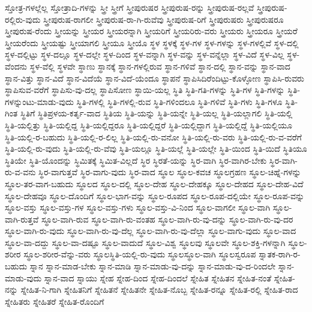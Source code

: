 {ಸ್ತೋತ್ರ-ಗಳಲ್ಲೆಲ್ಲ
ಸ್ತೋತ್ರಾದಿ-ಗಳನ್ನು
ಸ್ತ್ರೀ
ಸ್ತ್ರೀಗೆ
ಸ್ತ್ರೀಪುರುಷರ
ಸ್ತ್ರೀಪುರುಷ-ರನ್ನು
ಸ್ತ್ರೀಪುರುಷ-ರಲ್ಲವೆ
ಸ್ತ್ರೀಪುರುಷ-ರಲ್ಲಿರು-ವುದು
ಸ್ತ್ರೀಪುರುಷ-ರಾಗಲೀ
ಸ್ತ್ರೀಪುರುಷ-ರಾ-ಗಿ-ರುವೆವು
ಸ್ತ್ರೀಪುರುಷ-ರಿಗೆ
ಸ್ತ್ರೀಪುರುಷರು
ಸ್ತ್ರೀಪುರುಷರೂ
ಸ್ತ್ರೀಪುರುಷ-ರೆಂದು
ಸ್ತ್ರೀಯನ್ನು
ಸ್ತ್ರೀಯರ
ಸ್ತ್ರೀಯರನ್ನಾಗಿ
ಸ್ತ್ರೀಯರಿಗೆ
ಸ್ತ್ರೀಯರಿರು-ವರು
ಸ್ತ್ರೀಯರು
ಸ್ತ್ರೀಯರೂ
ಸ್ತ್ರೀಯರೆ
ಸ್ತ್ರೀಯರೆಂದು
ಸ್ತ್ರೀಯಷ್ಟು
ಸ್ತ್ರೀಯಾಗಲಿ
ಸ್ತ್ರೀಯೂ
ಸ್ತ್ರೀಯೊ
ಸ್ಥಳ
ಸ್ಥಳಕ್ಕೆ
ಸ್ಥಳ-ಗಳ
ಸ್ಥಳ-ಗಳನ್ನು
ಸ್ಥಳ-ಗಳಲ್ಲಿವೆ
ಸ್ಥಳ-ದಲ್ಲಿ
ಸ್ಥಳ-ದಲ್ಲಿಟ್ಟು
ಸ್ಥಳ-ದಲ್ಲೂ
ಸ್ಥಳ-ದಲ್ಲೇ
ಸ್ಥಳ-ದಿಂದ
ಸ್ಥಳ-ವನ್ನಾಗಿ
ಸ್ಥಳ-ವನ್ನು
ಸ್ಥಳ-ವನ್ನೆಲ್ಲಾ
ಸ್ಥಳ-ವಿದೆ
ಸ್ಥಳ-ವಿಲ್ಲ
ಸ್ಥಳ-ವೆಂದನು
ಸ್ಥಳ-ವೆಲ್ಲಿ
ಸ್ಥಳವೇ
ಸ್ಥಾಣು
ಸ್ಥಾನಕ್ಕೆ
ಸ್ಥಾನ-ಗಳಲ್ಲಿರುವ
ಸ್ಥಾನ-ಗಳಿವೆ
ಸ್ಥಾನ-ದಲ್ಲಿ
ಸ್ಥಾನ-ವನ್ನು
ಸ್ಥಾನ-ವಾದ
ಸ್ಥಾನ-ವಿತ್ತು
ಸ್ಥಾನ-ವಿದೆ
ಸ್ಥಾನ-ವಿದೆಯೆ
ಸ್ಥಾನ-ವಿದೆ-ಯೆಂದೂ
ಸ್ಥಾಪನೆ
ಸ್ಥಾಪಿಸಿದಿರೆಂದಿಟ್ಟು-ಕೊಳ್ಳೋಣ
ಸ್ಥಾಪಿಸಿ-ರುವರು
ಸ್ಥಾಪಿಸುವ-ವರೆಗೆ
ಸ್ಥಾಪಿಸು-ವು-ದಲ್ಲ
ಸ್ಥಾಪಿಸೋಣ
ಸ್ಥಾಯಿ-ಯಲ್ಲ
ಸ್ಥಿತಿ
ಸ್ಥಿತಿ-ಗತಿ-ಗಳನ್ನು
ಸ್ಥಿತಿ-ಗಳ
ಸ್ಥಿತಿ-ಗಳನ್ನು
ಸ್ಥಿತಿ-ಗಳನ್ನುಂಟು-ಮಾಡು-ವುದು
ಸ್ಥಿತಿ-ಗಳಲ್ಲಿ
ಸ್ಥಿತಿ-ಗಳಲ್ಲಿ-ರುವ
ಸ್ಥಿತಿ-ಗಳಿಂದಲೂ
ಸ್ಥಿತಿ-ಗಳಿವೆ
ಸ್ಥಿತಿ-ಗಳು
ಸ್ಥಿತಿ-ಗಳೂ
ಸ್ಥಿತಿ-ಗಿಂತ
ಸ್ಥಿತಿಗೆ
ಸ್ಥಿತಿಪ್ರಳಯ-ಕರ್ತೃ-ವಾದ
ಸ್ಥಿತಿಯ
ಸ್ಥಿತಿ-ಯನ್ನು
ಸ್ಥಿತಿ-ಯನ್ನೇ
ಸ್ಥಿತಿ-ಯಲ್ಲ
ಸ್ಥಿತಿ-ಯಲ್ಲಾಗಲಿ
ಸ್ಥಿತಿ-ಯಲ್ಲಿ
ಸ್ಥಿತಿ-ಯಲ್ಲಿತ್ತು
ಸ್ಥಿತಿ-ಯಲ್ಲಿದ್ದ
ಸ್ಥಿತಿ-ಯಲ್ಲಿದ್ದರೂ
ಸ್ಥಿತಿ-ಯಲ್ಲಿದ್ದರೆ
ಸ್ಥಿತಿ-ಯಲ್ಲಿದ್ದಾಗ
ಸ್ಥಿತಿ-ಯಲ್ಲಿದ್ದೆ
ಸ್ಥಿತಿ-ಯಲ್ಲಿಯೂ
ಸ್ಥಿತಿ-ಯಲ್ಲಿ-ರ-ಬಹುದು
ಸ್ಥಿತಿ-ಯಲ್ಲಿ-ರ-ಲಿಲ್ಲ
ಸ್ಥಿತಿ-ಯಲ್ಲಿ-ರು-ವನೋ
ಸ್ಥಿತಿ-ಯಲ್ಲಿ-ರು-ವರು
ಸ್ಥಿತಿ-ಯಲ್ಲಿ-ರು-ವ-ವರೆಗೆ
ಸ್ಥಿತಿ-ಯಲ್ಲಿ-ರು-ವುದು
ಸ್ಥಿತಿ-ಯಲ್ಲಿ-ರು-ವೆವು
ಸ್ಥಿತಿ-ಯಲ್ಲೂ
ಸ್ಥಿತಿ-ಯಲ್ಲೆ
ಸ್ಥಿತಿ-ಯಲ್ಲೇ
ಸ್ಥಿತಿ-ಯಿಂದ
ಸ್ಥಿತಿ-ಯಿದೆ
ಸ್ಥಿತಿಯೂ
ಸ್ಥಿತಿಯೇ
ಸ್ಥಿತಿ-ಯೊಂದನ್ನು
ಸ್ಥಿಮಿತಕ್ಕೆ
ಸ್ಥಿಮಿತ-ವಿಲ್ಲದೆ
ಸ್ಥಿರ
ಸ್ಥಿರತೆ-ಯನ್ನು
ಸ್ಥಿರ-ವಾಗಿ
ಸ್ಥಿರ-ವಾಗಿರ-ಬೇಕು
ಸ್ಥಿರ-ವಾಗಿ-ರು-ವ-ವನು
ಸ್ಥಿರ-ವಾಗುತ್ತವೆ
ಸ್ಥಿರ-ವಾಗು-ವುದು
ಸ್ಥಿರ-ವಾದ
ಸ್ಥೂಲ
ಸ್ಥೂಲ-ಕವಚ
ಸ್ಥೂಲಗ್ರಹಣ
ಸ್ಥೂಲ-ಚಿಹ್ನೆ-ಗಳನ್ನು
ಸ್ಥೂಲ-ತರ-ವಾಗ-ಬಹುದು
ಸ್ಥೂಲದ
ಸ್ಥೂಲ-ದಲ್ಲಿ
ಸ್ಥೂಲ-ದೇಹ
ಸ್ಥೂಲ-ದೇಹಕ್ಕೂ
ಸ್ಥೂಲ-ದೇಹದ
ಸ್ಥೂಲ-ದೇಹ-ವಿದೆ
ಸ್ಥೂಲ-ದೇಹವೂ
ಸ್ಥೂಲ-ದೊಂದಿಗೆ
ಸ್ಥೂಲ-ಭಾಗ-ವನ್ನು
ಸ್ಥೂಲ-ರೂಪದ
ಸ್ಥೂಲ-ರೂಪ-ದಲ್ಲಿಯೇ
ಸ್ಥೂಲ-ರೂಪ-ವನ್ನು
ಸ್ಥೂಲ-ವಸ್ತು
ಸ್ಥೂಲ-ವಸ್ತು-ಗಳ
ಸ್ಥೂಲ-ವಸ್ತು-ಗಳು
ಸ್ಥೂಲ-ವಸ್ತು-ವಿ-ನಿಂದ
ಸ್ಥೂಲ-ವಾಗಲೀ
ಸ್ಥೂಲ-ವಾಗಿ
ಸ್ಥೂಲ-ವಾಗಿ-ರುತ್ತವೆ
ಸ್ಥೂಲ-ವಾಗಿ-ರುವ
ಸ್ಥೂಲ-ವಾಗಿ-ರು-ವಂತಹ
ಸ್ಥೂಲ-ವಾಗಿ-ರು-ವು-ದನ್ನು
ಸ್ಥೂಲ-ವಾಗಿ-ರು-ವು-ದರ
ಸ್ಥೂಲ-ವಾಗಿ-ರು-ವುದು
ಸ್ಥೂಲ-ವಾಗಿ-ರು-ವು-ದೆಲ್ಲ
ಸ್ಥೂಲ-ವಾಗಿ-ರು-ವು-ದೆಲ್ಲಾ
ಸ್ಥೂಲ-ವಾಗು-ವುದು
ಸ್ಥೂಲ-ವಾದ
ಸ್ಥೂಲ-ವಾ-ದದ್ದು
ಸ್ಥೂಲ-ವಾ-ದಷ್ಟೂ
ಸ್ಥೂಲ-ವಾದುದೆ
ಸ್ಥೂಲ-ವಿಶ್ವ
ಸ್ಥೂಲವು
ಸ್ಥೂಲವೇ
ಸ್ಥೂಲ-ಶಕ್ತಿ-ಗಳನ್ನಾಗಿ
ಸ್ಥೂಲ-ಶರೀರ
ಸ್ಥೂಲ-ಶರೀರ-ವೆನ್ನು-ವರು
ಸ್ಥೂಲಸ್ಥಿತಿ-ಯಲ್ಲಿ-ರು-ವುದು
ಸ್ಥೂಲಸ್ಥೂಲ-ವಾಗಿ
ಸ್ಥೂಲಸ್ವರೂಪ
ಸ್ನಾತಕ-ರಾಗಿ-ರ-ಬಹುದು
ಸ್ನಾನ
ಸ್ನಾನ-ಮಾಡ-ಬೇಕು
ಸ್ನಾನ-ಮಾಡಿ
ಸ್ನಾನ-ಮಾಡು-ವು-ದನ್ನು
ಸ್ನಾನ-ಮಾಡು-ವು-ದ-ರಿಂದಲೇ
ಸ್ನಾನ-ಮಾಡು-ವುದು
ಸ್ನಾನ-ವಾದ
ಸ್ನಾಯು
ಸ್ನೇಹ
ಸ್ನೇಹ-ದಿಂದ
ಸ್ನೇಹ-ದಿಂದಲೆ
ಸ್ನೇಹಿತ
ಸ್ನೇಹಿತನ
ಸ್ನೇಹಿತ-ನಂತೆ
ಸ್ನೇಹಿತ-ನನ್ನು
ಸ್ನೇಹಿತ-ನಿ-ಗಾಗಿ
ಸ್ನೇಹಿತನಿಗೆ
ಸ್ನೇಹಿತನೆ
ಸ್ನೇಹಿತನೇ
ಸ್ನೇಹಿತ-ನೊಬ್ಬ
ಸ್ನೇಹಿತ-ರನ್ನೂ
ಸ್ನೇಹಿತ-ರಲ್ಲಿ
ಸ್ನೇಹಿತ-ರಾದ
ಸ್ನೇಹಿತರು
ಸ್ನೇಹಿತರೆ
ಸ್ನೇಹಿತ-ರೊಂದಿಗೆ
}
